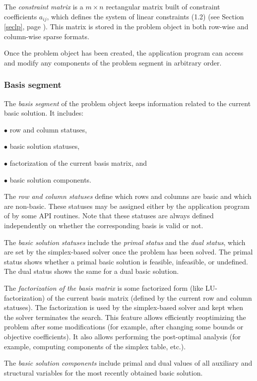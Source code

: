 The {\it constraint matrix} is a $m \times n$ rectangular matrix built
of constraint coefficients $a_{ij}$, which defines the system of linear
constraints (1.2) (see Section \ref{seclp}, page \pageref{seclp}). This
matrix is stored in the problem object in both row-wise and column-wise
sparse formats.

Once the problem object has been created, the application program can
access and modify any components of the problem segment in arbitrary
order.

\subsubsection*{Basis segment}

The {\it basis segment} of the problem object keeps information related
to the current basic solution. It includes:

$\bullet$ row and column statuses,

$\bullet$ basic solution statuses,

$\bullet$ factorization of the current basis matrix, and

$\bullet$ basic solution components.

The {\it row and column statuses} define which rows and columns are
basic and which are non-basic. These statuses may be assigned either by
the application program of by some API routines. Note that these
statuses are always defined independently on whether the corresponding
basis is valid or not.

The {\it basic solution statuses} include the {\it primal status} and
the {\it dual status}, which are set by the simplex-based solver once
the problem has been solved. The primal status shows whether a primal
basic solution is feasible, infeasible, or undefined. The dual status
shows the same for a dual basic solution.

The {\it factorization of the basis matrix} is some factorized form
(like LU-factorization) of the current basis matrix (defined by the
current row and column statuses). The factorization is used by the
simplex-based solver and kept when the solver terminates the search.
This feature allows efficiently reoptimizing the problem after some
modifications (for example, after changing some bounds or objective
coefficients). It also allows performing the post-optimal analysis (for
example, computing components of the simplex table, etc.).

The {\it basic solution components} include primal and dual values of
all auxiliary and structural variables for the most recently obtained
basic solution.

